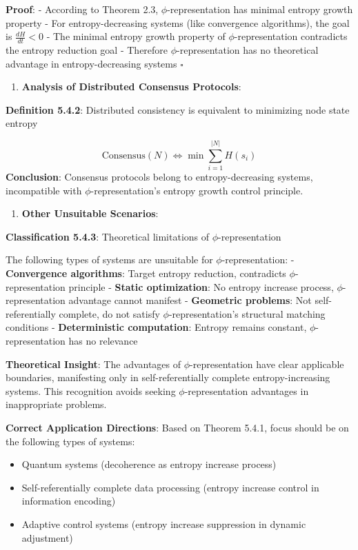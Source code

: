    \textbf{Proof}:
   - According to Theorem 2.3, $\phi$-representation has minimal entropy growth property
   - For entropy-decreasing systems (like convergence algorithms), the goal is $\frac{dH}{dt} < 0$
   - The minimal entropy growth property of $\phi$-representation contradicts the entropy reduction goal
   - Therefore $\phi$-representation has no theoretical advantage in entropy-decreasing systems $\square$

\begin{enumerate}
\item \textbf{Analysis of Distributed Consensus Protocols}:
\end{enumerate}
   \textbf{Definition 5.4.2}: Distributed consistency is equivalent to minimizing node state entropy
\label{def:5.4.2}
   
\begin{equation}
\text{Consensus}(N) \Leftrightarrow \min \sum_{i=1}^{|N|} H(s_i)
\end{equation}
   \textbf{Conclusion}: Consensus protocols belong to entropy-decreasing systems, incompatible with $\phi$-representation's entropy growth control principle.

\begin{enumerate}
\item \textbf{Other Unsuitable Scenarios}:
\end{enumerate}
   \textbf{Classification 5.4.3}: Theoretical limitations of $\phi$-representation
   
   The following types of systems are unsuitable for $\phi$-representation:
   - \textbf{Convergence algorithms}: Target entropy reduction, contradicts $\phi$-representation principle
   - \textbf{Static optimization}: No entropy increase process, $\phi$-representation advantage cannot manifest
   - \textbf{Geometric problems}: Not self-referentially complete, do not satisfy $\phi$-representation's structural matching conditions
   - \textbf{Deterministic computation}: Entropy remains constant, $\phi$-representation has no relevance

\textbf{Theoretical Insight}:
The advantages of $\phi$-representation have clear applicable boundaries, manifesting only in self-referentially complete entropy-increasing systems. This recognition avoids seeking $\phi$-representation advantages in inappropriate problems.

\textbf{Correct Application Directions}:
Based on Theorem 5.4.1, focus should be on the following types of systems:
\begin{itemize}
\item Quantum systems (decoherence as entropy increase process)
\item Self-referentially complete data processing (entropy increase control in information encoding)
\item Adaptive control systems (entropy increase suppression in dynamic adjustment)
\end{itemize}

